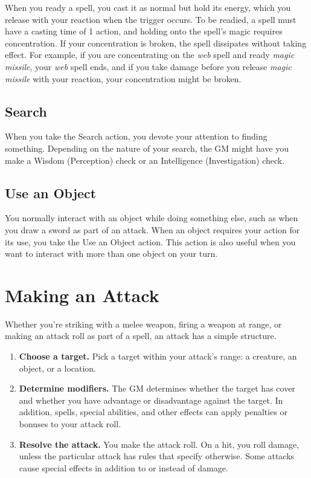 When you ready a spell, you cast it as normal but hold its energy, which you release with your reaction when the trigger occurs. To be readied, a spell must have a casting time of 1 action, and holding onto the spell's magic requires concentration. If your concentration is broken, the spell dissipates without taking effect. For example, if you are concentrating on the \textit{web} spell and ready \textit{magic missile}, your \textit{web} spell ends, and if you take damage before you release \textit{magic missile} with your reaction, your concentration might be broken.

\subsection{Search}

When you take the Search action, you devote your attention to finding something. Depending on the nature of your search, the GM might have you make a Wisdom (Perception) check or an Intelligence (Investigation) check.

\subsection{Use an Object}

You normally interact with an object while doing something else, such as when you draw a sword as part of an attack. When an object requires your action for its use, you take the Use an Object action. This action is also useful when you want to interact with more than one object on your turn.

\section{Making an Attack}

Whether you're striking with a melee weapon, firing a weapon at range, or making an attack roll as part of a spell, an attack has a simple structure.

\begin{enumerate}
\item \textbf{Choose a target.} Pick a target within your attack's range: a creature, an object, or a location.
\item \textbf{Determine modifiers.} The GM determines whether the target has cover and whether you have advantage or disadvantage against the target. In addition, spells, special abilities, and other effects can apply penalties or bonuses to your attack roll.
\item \textbf{Resolve the attack.} You make the attack roll. On a hit, you roll damage, unless the particular attack has rules that specify otherwise. Some attacks cause special effects in addition to or instead of damage.
\end{enumerate}

